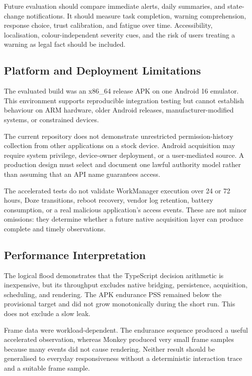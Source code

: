 Future evaluation should compare immediate alerts, daily summaries, and state-change notifications. It should measure task completion, warning comprehension, response choice, trust calibration, and fatigue over time. Accessibility, localisation, colour-independent severity cues, and the risk of users treating a warning as legal fact should be included.

\subsection{Platform and Deployment Limitations}

The evaluated build was an x86\_64 release APK on one Android 16 emulator. This environment supports reproducible integration testing but cannot establish behaviour on ARM hardware, older Android releases, manufacturer-modified systems, or constrained devices.

The current repository does not demonstrate unrestricted permission-history collection from other applications on a stock device. Android acquisition may require system privilege, device-owner deployment, or a user-mediated source. A production design must select and document one lawful authority model rather than assuming that an API name guarantees access.

The accelerated tests do not validate WorkManager execution over 24 or 72 hours, Doze transitions, reboot recovery, vendor log retention, battery consumption, or a real malicious application's access events. These are not minor omissions: they determine whether a future native acquisition layer can produce complete and timely observations.

\subsection{Performance Interpretation}

The logical flood demonstrates that the TypeScript decision arithmetic is inexpensive, but its throughput excludes native bridging, persistence, acquisition, scheduling, and rendering. The APK endurance PSS remained below the provisional target and did not grow monotonically during the short run. This does not exclude a slow leak.

Frame data were workload-dependent. The endurance sequence produced a useful accelerated observation, whereas Monkey produced very small frame samples because many events did not cause rendering. Neither result should be generalised to everyday responsiveness without a deterministic interaction trace and a suitable frame sample.

